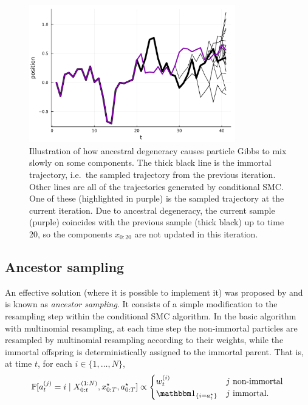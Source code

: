\begin{figure}
\centering
\includegraphics[width=0.8\textwidth]{plots/PG_degen.pdf}
\caption[Ancestral degeneracy in particle Gibbs]{Illustration of how ancestral degeneracy causes particle Gibbs to mix slowly on some components. The thick black line is the immortal trajectory, i.e.\ the sampled trajectory from the previous iteration. Other lines are all of the trajectories generated by conditional SMC. One of these (highlighted in purple) is the sampled trajectory at the current iteration. Due to ancestral degeneracy, the current sample (purple) coincides with the previous sample (thick black) up to time 20, so the components $x_{0:20}$ are not updated in this iteration.}
\label{fig:PG_ancdegen}
\end{figure}





\subsection{Ancestor sampling}\label{sec:ancsamp}
An effective solution (where it is possible to implement it) was proposed by \textcite{whiteley2010} and is known as \emph{ancestor sampling}.
It consists of a simple modification to the resampling step within the conditional SMC algorithm. 
In the basic algorithm with multinomial resampling, at each time step the non-immortal particles are resampled by multinomial resampling according to their weights, while the immortal offspring is deterministically assigned to the immortal parent. That is, at time $t$, for each $i \in \{1,\dots, N\}$,
\begin{equation*}
\Prob[a_t^{(j)} = i \mid X_{0:t}^{(1:N)}, x_{0:T}^\star, a_{0:T}^\star ] 
\propto \begin{cases}
w_t^{(i)} & j \text{ non-immortal} \\
\I{i = a_t^\star} & j \text{ immortal} .
\end{cases}
\end{equation*}

